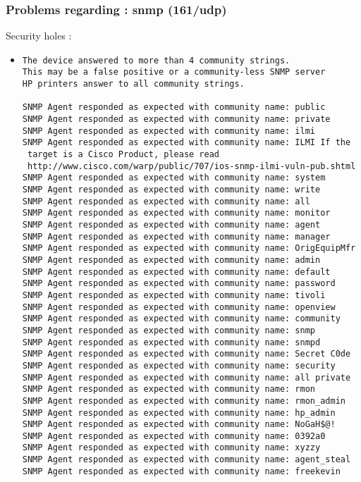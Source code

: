 \documentclass{article}
\begin{document}
\subsubsection{Problems regarding : snmp (161/udp)}
Security holes :\\
\begin{itemize}
\item \begin{verbatim}
The device answered to more than 4 community strings.
This may be a false positive or a community-less SNMP server
HP printers answer to all community strings.

SNMP Agent responded as expected with community name: public
SNMP Agent responded as expected with community name: private
SNMP Agent responded as expected with community name: ilmi
SNMP Agent responded as expected with community name: ILMI If the
 target is a Cisco Product, please read
 http://www.cisco.com/warp/public/707/ios-snmp-ilmi-vuln-pub.shtml
SNMP Agent responded as expected with community name: system
SNMP Agent responded as expected with community name: write
SNMP Agent responded as expected with community name: all
SNMP Agent responded as expected with community name: monitor
SNMP Agent responded as expected with community name: agent
SNMP Agent responded as expected with community name: manager
SNMP Agent responded as expected with community name: OrigEquipMfr
SNMP Agent responded as expected with community name: admin
SNMP Agent responded as expected with community name: default
SNMP Agent responded as expected with community name: password
SNMP Agent responded as expected with community name: tivoli
SNMP Agent responded as expected with community name: openview
SNMP Agent responded as expected with community name: community
SNMP Agent responded as expected with community name: snmp
SNMP Agent responded as expected with community name: snmpd
SNMP Agent responded as expected with community name: Secret C0de
SNMP Agent responded as expected with community name: security
SNMP Agent responded as expected with community name: all private
SNMP Agent responded as expected with community name: rmon
SNMP Agent responded as expected with community name: rmon_admin
SNMP Agent responded as expected with community name: hp_admin
SNMP Agent responded as expected with community name: NoGaH$@!
SNMP Agent responded as expected with community name: 0392a0
SNMP Agent responded as expected with community name: xyzzy
SNMP Agent responded as expected with community name: agent_steal
SNMP Agent responded as expected with community name: freekevin

\end{verbatim}
\end{itemize}
\end{document}
